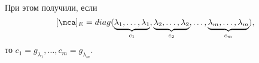 \documentclass[main]{subfiles}
\begin{document}
\begin{remark}
    При этом получили, если
    \[[\mca]_E = diag(\underbrace{\lambda_1, \ldots, \lambda_1}_{c_1},
        \underbrace{\lambda_2, \ldots, \lambda_2}_{c_2}, \ldots,
        \underbrace{\lambda_m, \ldots, \lambda_m}_{c_m}),\]
    то $c_1 = g_{\lambda_1}, \ldots,c_m = g_{\lambda_m}$.
\end{remark}
\end{document}
